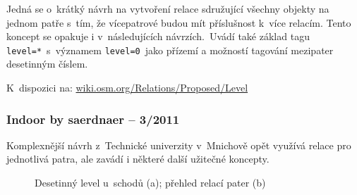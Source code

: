 Jedná se o~krátký návrh na vytvoření relace sdružující všechny objekty na jednom patře s~tím, že vícepatrové budou mít příslušnost k~více relacím. Tento koncept se opakuje i v~následujících návrzích.~Uvádí také základ tagu \texttt{level=*}~s~významem \texttt{level=0}~jako přízemí a možností tagování mezipater desetinným číslem.

K~dispozici na: \href{http://wiki.osm.org/Relations/Proposed/Level}{wiki.osm.org/Relations/Proposed/Level}~

\subsubsection{Indoor by saerdnaer -- 3/2011}\label{indoor-by-saerdnaer-32011}

Komplexnější návrh z~Technické univerzity v~Mnichově opět využívá relace pro jednotlivá patra, ale zavádí i některé další užitečné koncepty.


                      \begin{figure}
                    
                    \hfill

                    \caption{Desetinný level u~schodů (a); přehled relací pater (b)\cite{zdroj47}}
                    \label{obr26}
                    \end{figure}
                    


